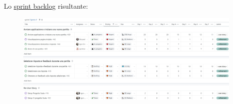 
Lo \href{https://github.com/orgs/ISIQuiz/projects/3/views/15}{sprint backlog} risultante:

\begin{figure}[H]
    \centering
    \includegraphics[width=\textwidth]{process/Img/Sprint4BL.jpg}
    \label{fig:Sprint4BL}
\end{figure}